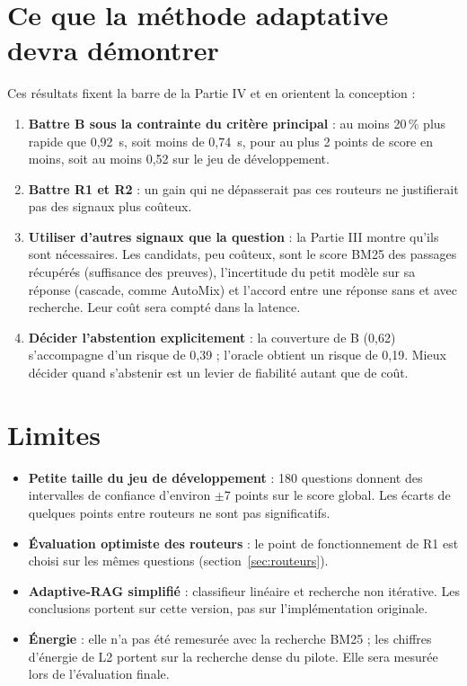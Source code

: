 \documentclass[11pt,a4paper]{article}
\begin{document}
\section{Ce que la méthode adaptative devra démontrer}\label{sec:barre}

Ces résultats fixent la barre de la Partie IV et en orientent la conception :
\begin{enumerate}
\item \textbf{Battre B sous la contrainte du critère principal} : au moins 20\,\% plus rapide que 0,92~s,
soit moins de 0,74~s, pour au plus 2 points de score en moins, soit au moins 0,52 sur le jeu de
développement.
\item \textbf{Battre R1 et R2} : un gain qui ne dépasserait pas ces routeurs ne justifierait pas des
signaux plus coûteux.
\item \textbf{Utiliser d'autres signaux que la question} : la Partie III montre qu'ils sont nécessaires.
Les candidats, peu coûteux, sont le score BM25 des passages récupérés (suffisance des preuves),
l'incertitude du petit modèle sur sa réponse (cascade, comme AutoMix) et l'accord entre une réponse sans
et avec recherche. Leur coût sera compté dans la latence.
\item \textbf{Décider l'abstention explicitement} : la couverture de B (0,62) s'accompagne d'un risque
de 0,39 ; l'oracle obtient un risque de 0,19. Mieux décider quand s'abstenir est un levier de fiabilité
autant que de coût.
\end{enumerate}

\section{Limites}\label{sec:limites}

\begin{itemize}
\item \textbf{Petite taille du jeu de développement} : 180 questions donnent des intervalles de
confiance d'environ $\pm$7 points sur le score global. Les écarts de quelques points entre routeurs ne
sont pas significatifs.
\item \textbf{Évaluation optimiste des routeurs} : le point de fonctionnement de R1 est choisi sur les
mêmes questions (section~\ref{sec:routeurs}).
\item \textbf{Adaptive-RAG simplifié} : classifieur linéaire et recherche non itérative. Les conclusions
portent sur cette version, pas sur l'implémentation originale.
\item \textbf{Énergie} : elle n'a pas été remesurée avec la recherche BM25 ; les chiffres d'énergie de
L2 portent sur la recherche dense du pilote. Elle sera mesurée lors de l'évaluation finale.
\end{itemize}
\end{document}
